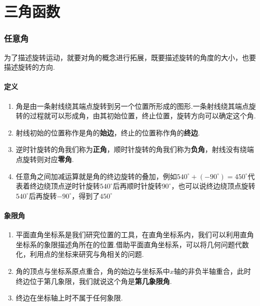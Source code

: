 \chapter* {三角函数}
\subsection*{任意角}
为了描述旋转运动，就要对角的概念进行拓展，既要描述旋转的角度的大小，也要描述旋转的方向.
\subsubsection*{定义}
\begin{enumerate}
    \item 角是由一条射线绕其端点旋转到另一个位置所形成的图形.一条射线绕其端点旋转的过程就可以形成角，由其初始位置，终止位置，旋转方向可以确定这个角.
    \item 射线初始的位置称作是角的\textbf{始边}，终止的位置称作角的\textbf{终边}.
    \item 逆时针旋转的角我们称为\textbf{正角}，顺时针旋转的角我们称为\textbf{负角}，射线没有绕端点旋转则对应\textbf{零角}.
    \item 任意角之间加减运算就是角的终边旋转的叠加，例如$540^{\circ} + (-90^{\circ}) = 450^{\circ}$代表着终边绕顶点逆时针旋转$540^{\circ}$后再顺时针旋转$90^{\circ}$，也可以说终边绕顶点旋转$540^{\circ}$后再旋转$-90^{\circ}$，得到了$450^{\circ}$
\end{enumerate}
\subsubsection*{象限角}
\begin{enumerate}
    \item 平面直角坐标系是我们研究位置的工具，在直角坐标系内，我们可以利用直角坐标系的象限描述角所在的位置.借助平面直角坐标系，可以将几何问题代数化，利用点的坐标来研究与角相关的问题.
    \item 角的顶点与坐标系原点重合，角的始边与坐标系中$x$轴的非负半轴重合，此时终边位于第几象限，我们就说这个角是\textbf{第几象限角}.
    \item 终边在坐标轴上时不属于任何象限.
\end{enumerate}
